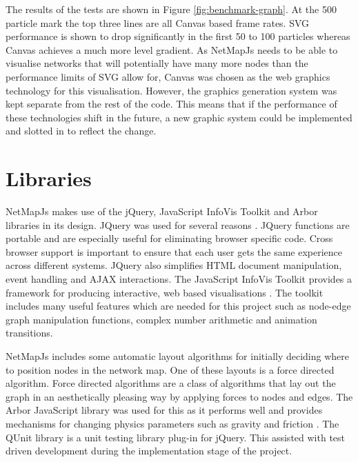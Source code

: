 \documentclass[11pt, a4paper]{report}
\begin{document}
The results of the tests are shown in Figure \ref{fig:benchmark-graph}. At the
500 particle mark the top three lines are all Canvas based frame rates. SVG
performance is shown to drop significantly in the first 50 to 100 particles
whereas Canvas achieves a much more level gradient. As NetMapJs needs to be
able to visualise networks that will potentially have many more nodes than the
performance limits of SVG allow for, Canvas was chosen as the web graphics
technology for this visualisation. However, the graphics generation system was
kept separate from the rest of the code. This means that if the performance of
these technologies shift in the future, a new graphic system could be
implemented and slotted in to reflect the change.


\section{Libraries}
\label{sec:libraries}

NetMapJs makes use of the jQuery, JavaScript InfoVis Toolkit and Arbor libraries
in its design. JQuery was used for several reasons \cite{jQuery_website}. JQuery
functions are portable and are especially useful for eliminating browser
specific code. Cross browser support is important to ensure that each user gets
the same experience across different systems. JQuery also simplifies HTML
document manipulation, event handling and AJAX interactions. The JavaScript
InfoVis Toolkit provides a framework for producing interactive, web based
visualisations \cite{thejit_website}. The toolkit includes many useful features
which are needed for this project such as node-edge graph manipulation
functions, complex number arithmetic and animation transitions.

NetMapJs includes some automatic layout algorithms for initially deciding where
to position nodes in the network map. One of these layouts is a force directed
algorithm. Force directed algorithms are a class of algorithms that lay out the
graph in an aesthetically pleasing way by applying forces to nodes and edges.
The Arbor JavaScript library was used for this as it performs well and provides
mechanisms for changing physics parameters such as gravity and friction
\cite{Arbor_website}. The QUnit library is a unit testing library plug-in for
jQuery. This assisted with test driven development during the implementation
stage of the project.
\end{document}
